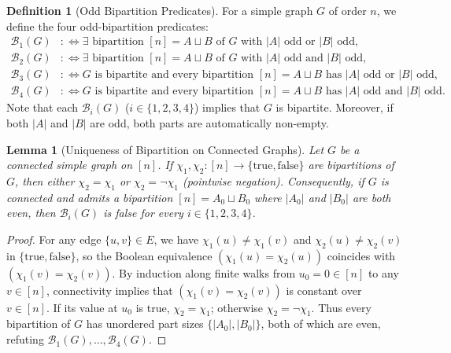 \documentclass[11pt,a4paper]{article}
\newtheorem{lemma}[theorem]{Lemma}
\theoremstyle{definition}
\newtheorem{definition}[theorem]{Definition}
\begin{document}
\begin{definition}[Odd Bipartition Predicates]
\label{def:oddbip}
For a simple graph $G$ of order $n$, we define the four odd-bipartition predicates:
\begin{align*}
\mathcal{B}_1(G) &: \iff \exists \text{ bipartition } [n] = A \sqcup B \text{ of } G \text{ with } |A| \text{ odd or } |B| \text{ odd}, \\
\mathcal{B}_2(G) &: \iff \exists \text{ bipartition } [n] = A \sqcup B \text{ of } G \text{ with } |A| \text{ odd and } |B| \text{ odd}, \\
\mathcal{B}_3(G) &: \iff G \text{ is bipartite and every bipartition } [n] = A \sqcup B \text{ has } |A| \text{ odd or } |B| \text{ odd}, \\
\mathcal{B}_4(G) &: \iff G \text{ is bipartite and every bipartition } [n] = A \sqcup B \text{ has } |A| \text{ odd and } |B| \text{ odd}.
\end{align*}
Note that each $\mathcal{B}_i(G)$ ($i \in \{1,2,3,4\}$) implies that $G$ is bipartite.
Moreover, if both $|A|$ and $|B|$ are odd, both parts are automatically non-empty.
\end{definition}

\begin{lemma}[Uniqueness of Bipartition on Connected Graphs]
\label{lem:unique-bip}
Let $G$ be a connected simple graph on $[n]$. If $\chi_1, \chi_2 : [n] \to \{\mathrm{true}, \mathrm{false}\}$
are bipartitions of $G$, then either $\chi_2 = \chi_1$ or $\chi_2 = \neg \chi_1$
(pointwise negation). Consequently, if $G$ is connected and admits a bipartition
$[n] = A_0 \sqcup B_0$ where $|A_0|$ and $|B_0|$ are both even, then $\mathcal{B}_i(G)$
is false for every $i \in \{1, 2, 3, 4\}$.
\end{lemma}

\begin{proof}
For any edge $\{u, v\} \in E$, we have $\chi_1(u) \neq \chi_1(v)$ and
$\chi_2(u) \neq \chi_2(v)$ in $\{\mathrm{true}, \mathrm{false}\}$, so the Boolean
equivalence $(\chi_1(u) = \chi_2(u))$ coincides with $(\chi_1(v) = \chi_2(v))$.
By induction along finite walks from $u_0 = 0 \in [n]$ to any $v \in [n]$, connectivity
implies that $(\chi_1(v) = \chi_2(v))$ is constant over $v \in [n]$. If its value at
$u_0$ is true, $\chi_2 = \chi_1$; otherwise $\chi_2 = \neg \chi_1$. Thus every
bipartition of $G$ has unordered part sizes $\{|A_0|, |B_0|\}$, both of which are
even, refuting $\mathcal{B}_1(G), \dots, \mathcal{B}_4(G)$.
\end{proof}
\end{document}
